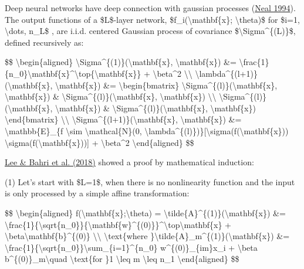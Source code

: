 Deep neural networks have deep connection with gaussian processes (\href{https://www.cs.toronto.edu/~radford/ftp/pin.pdf}{Neal 1994}). The output functions of a \$L\$-layer network, \$f\_i(\textbackslash mathbf\{x\}; \textbackslash theta)\$ for \$i=1, \textbackslash dots, n\_L\$ , are i.i.d. centered Gaussian process of covariance \$\textbackslash Sigma\^{}\{(L)\}\$, defined recursively as:

\$\$ \textbackslash begin\{aligned\} \textbackslash Sigma\^{}\{(1)\}(\textbackslash mathbf\{x\}, \textbackslash mathbf\{x\}\textquotesingle) \&= \textbackslash frac\{1\}\{n\_0\}\textbackslash mathbf\{x\}\^{}\textbackslash top\{\textbackslash mathbf\{x\}\textquotesingle\} + \textbackslash beta\^{}2 \textbackslash\textbackslash{} \textbackslash lambda\^{}\{(l+1)\}(\textbackslash mathbf\{x\}, \textbackslash mathbf\{x\}\textquotesingle) \&= \textbackslash begin\{bmatrix\} \textbackslash Sigma\^{}\{(l)\}(\textbackslash mathbf\{x\}, \textbackslash mathbf\{x\}) \& \textbackslash Sigma\^{}\{(l)\}(\textbackslash mathbf\{x\}, \textbackslash mathbf\{x\}\textquotesingle) \textbackslash\textbackslash{} \textbackslash Sigma\^{}\{(l)\}(\textbackslash mathbf\{x\}\textquotesingle, \textbackslash mathbf\{x\}) \& \textbackslash Sigma\^{}\{(l)\}(\textbackslash mathbf\{x\}\textquotesingle, \textbackslash mathbf\{x\}\textquotesingle) \textbackslash end\{bmatrix\} \textbackslash\textbackslash{} \textbackslash Sigma\^{}\{(l+1)\}(\textbackslash mathbf\{x\}, \textbackslash mathbf\{x\}\textquotesingle) \&= \textbackslash mathbb\{E\}\_\{f \textbackslash sim \textbackslash mathcal\{N\}(0, \textbackslash lambda\^{}\{(l)\})\}{[}\textbackslash sigma(f(\textbackslash mathbf\{x\})) \textbackslash sigma(f(\textbackslash mathbf\{x\}\textquotesingle)){]} + \textbackslash beta\^{}2 \textbackslash end\{aligned\} \$\$

\href{https://arxiv.org/abs/1711.00165}{Lee \& Bahri et al. (2018)} showed a proof by mathematical induction:

(1) Let's start with \$L=1\$, when there is no nonlinearity function and the input is only processed by a simple affine transformation:

\$\$ \textbackslash begin\{aligned\} f(\textbackslash mathbf\{x\};\textbackslash theta) = \textbackslash tilde\{A\}\^{}\{(1)\}(\textbackslash mathbf\{x\}) \&= \textbackslash frac\{1\}\{\textbackslash sqrt\{n\_0\}\}\{\textbackslash mathbf\{w\}\^{}\{(0)\}\}\^{}\textbackslash top\textbackslash mathbf\{x\} + \textbackslash beta\textbackslash mathbf\{b\}\^{}\{(0)\} \textbackslash\textbackslash{} \textbackslash text\{where \}\textbackslash tilde\{A\}\_m\^{}\{(1)\}(\textbackslash mathbf\{x\}) \&= \textbackslash frac\{1\}\{\textbackslash sqrt\{n\_0\}\}\textbackslash sum\_\{i=1\}\^{}\{n\_0\} w\^{}\{(0)\}\_\{im\}x\_i + \textbackslash beta b\^{}\{(0)\}\_m\textbackslash quad \textbackslash text\{for \}1 \textbackslash leq m \textbackslash leq n\_1 \textbackslash end\{aligned\} \$\$

